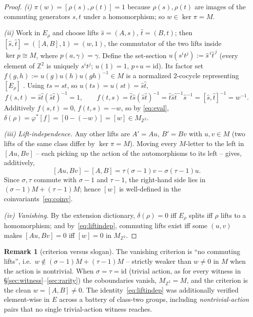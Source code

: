 \documentclass[11pt]{article}
\theoremstyle{definition}
\newtheorem{remark}[theorem]{Remark}
\newcommand{\id}{\mathrm{id}}
\newcommand{\Z}{\mathbb{Z}}
\begin{document}
\begin{proof}
\emph{(i)} $\pi(w)=[\rho(s),\rho(t)]=1$ because $\rho(s),\rho(t)$ are images of the commuting
generators $s,t$ under a homomorphism; so $w\in\ker\pi=M$.

\emph{(ii)} Work in $E_\rho$ and choose lifts $\hat s=(A,s)$, $\hat t=(B,t)$; then
$[\hat s,\hat t]=([A,B],1)=(w,1)$, the commutator of the two lifts inside $\ker p\cong M$,
where $p(a,\gamma)=\gamma$. Define the set-section $u(s^it^j):=\hat s^{\,i}\hat t^{\,j}$ (every
element of $\Z^2$ is uniquely $s^it^j$; $u(1)=1$, $p\circ u=\id$). Its factor set
$f(g,h):=u(g)u(h)u(gh)^{-1}\in M$ is a normalized $2$-cocycle representing $[E_\rho]$
\cite[IV.3]{brown}. Using $ts=st$, so $u(ts)=u(st)=\hat s\hat t$,
\[
f(s,t)=\hat s\hat t(\hat s\hat t)^{-1}=1,\qquad
f(t,s)=\hat t\hat s(\hat s\hat t)^{-1}=\hat t\hat s\hat t^{-1}\hat s^{-1}=[\hat s,\hat t]^{-1}=w^{-1}.
\]
Additively $f(s,t)=0$, $f(t,s)=-w$, so by \eqref{eq:eval},
$\delta(\rho)=\varphi^*[f]=[0-(-w)]=[w]\in M_{\Z^2}$.

\emph{(iii) Lift-independence.} Any other lifts are $A'=Au$, $B'=Bv$ with $u,v\in M$ (two lifts
of the same class differ by $\ker\pi=M$). Moving every $M$-letter to the left in
$[Au,Bv]$ -- each picking up the action of the automorphisms to its left -- gives, additively,
\begin{equation}\label{eq:liftindep}
[Au,Bv]-[A,B]=\tau(\sigma-1)v-\sigma(\tau-1)u.
\end{equation}
Since $\sigma,\tau$ commute with $\sigma-1$ and $\tau-1$, the right-hand side lies in
$(\sigma-1)M+(\tau-1)M$; hence $[w]$ is well-defined in the coinvariants~\eqref{eq:coinv}.

\emph{(iv) Vanishing.} By the extension dictionary, $\delta(\rho)=0$ iff $E_\rho$ splits iff
$\rho$ lifts to a homomorphism; and by~\eqref{eq:liftindep}, commuting lifts exist iff some
$(u,v)$ makes $[Au,Bv]=0$ iff $[w]=0$ in $M_{\Z^2}$.
\end{proof}

\begin{remark}[criterion versus slogan]\label{rem:slogan}
The vanishing criterion is ``no commuting lifts'', i.e.\ $w\notin(\sigma-1)M+(\tau-1)M$ --
strictly weaker than $w\neq0$ in $M$ when the action is nontrivial. When $\sigma=\tau=\id$
(trivial action, as for every witness in \S\ref{sec:witness}--\ref{sec:rarity}) the
coboundaries vanish, $M_{\Z^2}=M$, and the criterion is the clean $w=[A,B]\neq0$. The
identity~\eqref{eq:liftindep} was additionally verified element-wise in $E$ across a battery of
class-two groups, including \emph{nontrivial-action} pairs that no single trivial-action witness
reaches.
\end{remark}
\end{document}
